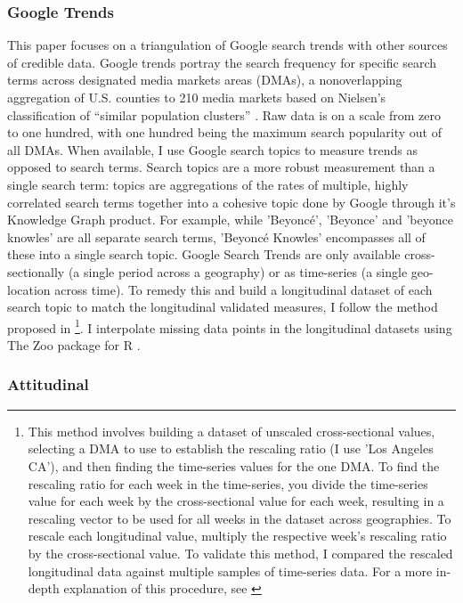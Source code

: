 \subsubsection{Google Trends}
This paper focuses on a triangulation of Google search trends
\citep{googletrends} with other sources of credible data. Google trends portray
the search frequency for specific search terms across designated media markets
areas (DMAs), a nonoverlapping aggregation of U.S. counties to 210 media markets
based on Nielsen's classification of ``similar population clusters''
\citep{dma_key}. Raw data is on a scale from zero to one hundred, with one
hundred being the maximum search popularity out of all DMAs. When available, I
use Google search topics to measure trends as opposed to search terms. Search
topics are a more robust measurement than a single search term: topics are
aggregations of the rates of multiple, highly correlated search terms together
into a cohesive topic done by Google through it's Knowledge Graph product. For
example, while 'Beyoncé', 'Beyonce' and 'beyonce knowles' are all separate
search terms, 'Beyoncé Knowles' encompasses all of these into a single search
topic. Google Search Trends are only available cross-sectionally (a single
period across a geography) or as time-series (a single geo-location across
time). To remedy this and build a longitudinal dataset of each search topic to
match the longitudinal validated measures, I follow the method proposed in
\citet[][p. 5]{park_etal}\footnote{This method involves building a dataset of
unscaled cross-sectional values, selecting a DMA to use to establish the
rescaling ratio (I use 'Los Angeles CA'), and then finding the time-series
values for the one DMA. To find the rescaling ratio for each week in the
time-series, you divide the time-series value for each week by the
cross-sectional value for each week, resulting in a rescaling vector to be used
for all weeks in the dataset across geographies. To rescale each longitudinal
value, multiply the respective week's rescaling ratio by the cross-sectional
value. To validate this method, I compared the rescaled longitudinal data
against multiple samples of time-series data. For a more in-depth explanation of
this procedure, see \citet[p. 5]{park_etal}}. I interpolate missing data points
in the longitudinal datasets using The Zoo package for R \citep{zoo}.

\subsubsection{Attitudinal}

